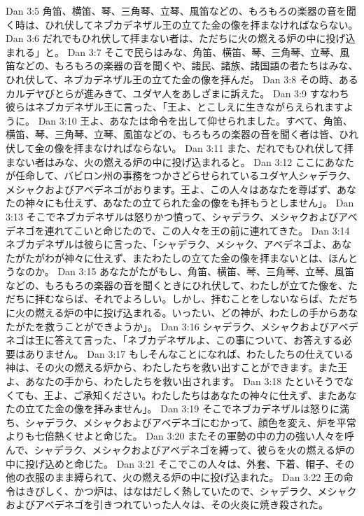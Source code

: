 Dan 3:5  角笛、横笛、琴、三角琴、立琴、風笛などの、もろもろの楽器の音を聞く時は、ひれ伏してネブカデネザル王の立てた金の像を拝まなければならない。
Dan 3:6  だれでもひれ伏して拝まない者は、ただちに火の燃える炉の中に投げ込まれる」と。
Dan 3:7  そこで民らはみな、角笛、横笛、琴、三角琴、立琴、風笛などの、もろもろの楽器の音を聞くや、諸民、諸族、諸国語の者たちはみな、ひれ伏して、ネブカデネザル王の立てた金の像を拝んだ。
Dan 3:8  その時、あるカルデヤびとらが進みきて、ユダヤ人をあしざまに訴えた。
Dan 3:9  すなわち彼らはネブカデネザル王に言った、「王よ、とこしえに生きながらえられますように。
Dan 3:10  王よ、あなたは命令を出して仰せられました。すべて、角笛、横笛、琴、三角琴、立琴、風笛などの、もろもろの楽器の音を聞く者は皆、ひれ伏して金の像を拝まなければならない。
Dan 3:11  また、だれでもひれ伏して拝まない者はみな、火の燃える炉の中に投げ込まれると。
Dan 3:12  ここにあなたが任命して、バビロン州の事務をつかさどらせられているユダヤ人シャデラク、メシャクおよびアベデネゴがおります。王よ、この人々はあなたを尊ばず、あなたの神々にも仕えず、あなたの立てられた金の像をも拝もうとしません」。
Dan 3:13  そこでネブカデネザルは怒りかつ憤って、シャデラク、メシャクおよびアベデネゴを連れてこいと命じたので、この人々を王の前に連れてきた。
Dan 3:14  ネブカデネザルは彼らに言った、「シャデラク、メシャク、アベデネゴよ、あなたがたがわが神々に仕えず、またわたしの立てた金の像を拝まないとは、ほんとうなのか。
Dan 3:15  あなたがたがもし、角笛、横笛、琴、三角琴、立琴、風笛などの、もろもろの楽器の音を聞くときにひれ伏して、わたしが立てた像を、ただちに拝むならば、それでよろしい。しかし、拝むことをしないならば、ただちに火の燃える炉の中に投げ込まれる。いったい、どの神が、わたしの手からあなたがたを救うことができようか」。
Dan 3:16  シャデラク、メシャクおよびアベデネゴは王に答えて言った、「ネブカデネザルよ、この事について、お答えする必要はありません。
Dan 3:17  もしそんなことになれば、わたしたちの仕えている神は、その火の燃える炉から、わたしたちを救い出すことができます。また王よ、あなたの手から、わたしたちを救い出されます。
Dan 3:18  たといそうでなくても、王よ、ご承知ください。わたしたちはあなたの神々に仕えず、またあなたの立てた金の像を拝みません」。
Dan 3:19  そこでネブカデネザルは怒りに満ち、シャデラク、メシャクおよびアベデネゴにむかって、顔色を変え、炉を平常よりも七倍熱くせよと命じた。
Dan 3:20  またその軍勢の中の力の強い人々を呼んで、シャデラク、メシャクおよびアベデネゴを縛って、彼らを火の燃える炉の中に投げ込めと命じた。
Dan 3:21  そこでこの人々は、外套、下着、帽子、その他の衣服のまま縛られて、火の燃える炉の中に投げ込まれた。
Dan 3:22  王の命令はきびしく、かつ炉は、はなはだしく熱していたので、シャデラク、メシャクおよびアベデネゴを引きつれていった人々は、その火炎に焼き殺された。
